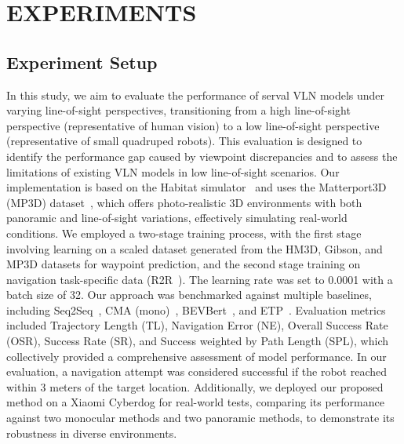 
\section{EXPERIMENTS}
\vspace{-5pt}
\subsection{Experiment Setup}





In this study, we aim to evaluate the performance of serval VLN models under varying line-of-sight perspectives, transitioning from a high line-of-sight perspective (representative of human vision) to a low line-of-sight perspective (representative of small quadruped robots). This evaluation is designed to identify the performance gap caused by viewpoint discrepancies and to assess the limitations of existing VLN models in low line-of-sight scenarios. Our implementation is based on the Habitat simulator~\cite{savva2019habitat} and uses the Matterport3D (MP3D) dataset~\cite{chang2017matterport3d}, which offers photo-realistic 3D environments with both panoramic and line-of-sight variations, effectively simulating real-world conditions. We employed a two-stage training process, with the first stage involving learning on a scaled dataset generated from the HM3D, Gibson, and MP3D datasets for waypoint prediction, and the second stage training on navigation task-specific data (R2R~\cite{krantz2020beyond}). The learning rate was set to 0.0001 with a batch size of 32. Our approach was benchmarked against multiple baselines, including Seq2Seq~\cite{krantz2020beyond}, CMA (mono)~\cite{krantz2020beyond}, BEVBert~\cite{an2022bevbert}, and ETP~\cite{an2023etpnav}. Evaluation metrics included Trajectory Length (TL), Navigation Error (NE), Overall Success Rate (OSR), Success Rate (SR), and Success weighted by Path Length (SPL), which collectively provided a comprehensive assessment of model performance. In our evaluation, a navigation attempt was considered successful if the robot reached within 3 meters of the target location. Additionally, we deployed our proposed method on a Xiaomi Cyberdog for real-world tests, comparing its performance against two monocular methods and two panoramic methods, to demonstrate its robustness in diverse environments.
